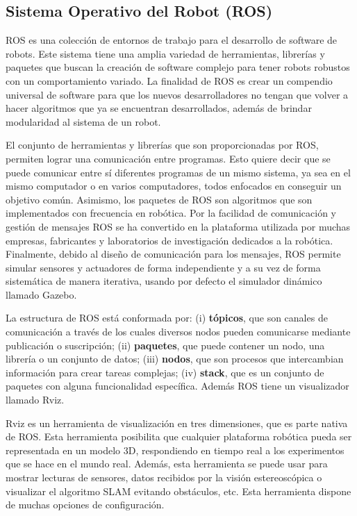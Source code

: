 \subsection{Sistema Operativo del Robot (ROS)}
ROS es una colección de entornos de trabajo para el desarrollo de software de 
robots. Este sistema tiene una amplia variedad de herramientas, librerías y paquetes 
que buscan la creación de software complejo para tener robots robustos con un 
comportamiento variado. La finalidad de ROS es crear un compendio universal de software 
para que los nuevos desarrolladores no tengan que volver a hacer algoritmos que ya 
se encuentran desarrollados, además de brindar modularidad al sistema de un robot.

El conjunto de herramientas y librerías que son proporcionadas por ROS, permiten 
lograr una comunicación entre programas. Esto quiere decir que se puede comunicar 
entre sí diferentes programas de un mismo sistema, ya sea en el mismo computador 
o en varios computadores, todos enfocados en conseguir un objetivo común. 
Asimismo, los paquetes de ROS son algoritmos que son implementados con 
frecuencia en robótica. Por la facilidad de comunicación y gestión de mensajes 
ROS se ha convertido en la plataforma utilizada por muchas empresas, fabricantes y 
laboratorios de investigación dedicados a la robótica. Finalmente, debido al diseño 
de comunicación para los mensajes, ROS permite simular sensores y actuadores de forma 
independiente y a su vez de forma sistemática de manera iterativa, usando por defecto 
el simulador dinámico llamado Gazebo.

La estructura de ROS está conformada por: 
(i) \textbf{tópicos}, que son canales de comunicación a través de los cuales diversos 
nodos pueden comunicarse mediante publicación o suscripción; (ii) \textbf{paquetes}, que 
puede contener un nodo, una librería o un conjunto de datos; (iii) \textbf{nodos}, que 
son procesos que intercambian información para crear tareas complejas; (iv) \textbf{stack}, 
que es un conjunto de paquetes con alguna funcionalidad específica. Además ROS tiene un 
visualizador llamado Rviz.

Rviz es un herramienta de visualización en tres dimensiones, que es parte nativa de 
ROS. Esta herramienta posibilita que cualquier plataforma robótica pueda ser 
representada en un modelo 3D, respondiendo en tiempo real a los experimentos que se 
hace en el mundo real. Además, esta herramienta se puede usar para mostrar lecturas 
de sensores, datos recibidos por la visión estereoscópica o visualizar el algoritmo 
SLAM evitando obstáculos, etc. Esta herramienta dispone de muchas opciones de 
configuración.

